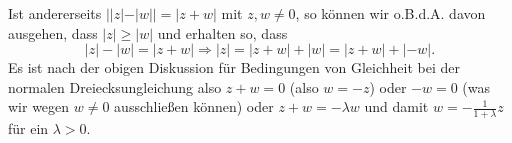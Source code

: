 \documentclass[a4paper,10pt]{article}
\begin{document}
Ist andererseits $||z|-|w|| = |z+w|$ mit $z, w \neq 0$, so können wir o.B.d.A. davon ausgehen, dass $|z| \geq |w|$ und erhalten so, dass
\[
 |z|-|w| = |z+w| \Rightarrow |z| = |z+w|+|w| = |z+w| + |-w|.
\]
Es ist nach der obigen Diskussion für Bedingungen von Gleichheit bei der normalen Dreiecksungleichung also $z+w=0$ (also $w = -z$) oder $-w = 0$ (was wir wegen $w \neq 0$ ausschließen können) oder $z+w = - \lambda w$ und damit $w = - \frac{1}{1+\lambda} z$ für ein $\lambda > 0$.
\end{document}
